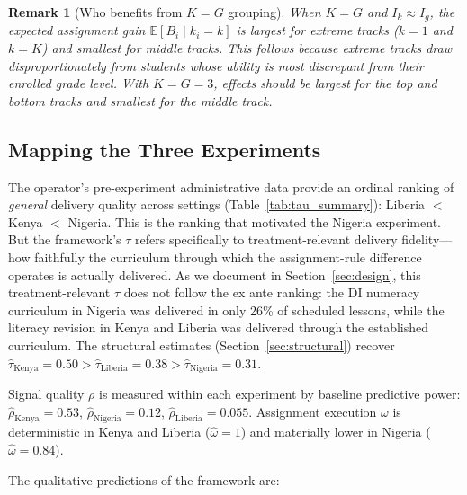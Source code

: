 \documentclass[11pt]{article}
\newtheorem{remark}{Remark}
\newcommand{\E}{\mathbb{E}}
\begin{document}
\begin{remark}[Who benefits from $K = G$ grouping]
\label{rem:tail_effects}
When $K = G$ and $I_k \approx I_g$, the expected assignment gain $\E[B_i \mid k_i = k]$ is largest for extreme tracks ($k = 1$ and $k = K$) and smallest for middle tracks. This follows because extreme tracks draw disproportionately from students whose ability is most discrepant from their enrolled grade level. With $K = G = 3$, effects should be largest for the top and bottom tracks and smallest for the middle track.
\end{remark}

\subsection{Mapping the Three Experiments}

The operator's pre-experiment administrative data provide an ordinal ranking of \emph{general} delivery quality across settings (Table~\ref{tab:tau_summary}): Liberia $<$ Kenya $<$ Nigeria. This is the ranking that motivated the Nigeria experiment. But the framework's $\tau$ refers specifically to treatment-relevant delivery fidelity---how faithfully the curriculum through which the assignment-rule difference operates is actually delivered. As we document in Section~\ref{sec:design}, this treatment-relevant $\tau$ does not follow the ex ante ranking: the DI numeracy curriculum in Nigeria was delivered in only 26\% of scheduled lessons, while the literacy revision in Kenya and Liberia was delivered through the established curriculum. The structural estimates (Section~\ref{sec:structural}) recover $\hat{\tau}_{\text{Kenya}} = 0.50 > \hat{\tau}_{\text{Liberia}} = 0.38 > \hat{\tau}_{\text{Nigeria}} = 0.31$.

Signal quality $\rho$ is measured within each experiment by baseline predictive power: $\hat{\rho}_{\text{Kenya}} = 0.53$, $\hat{\rho}_{\text{Nigeria}} = 0.12$, $\hat{\rho}_{\text{Liberia}} = 0.055$. Assignment execution $\omega$ is deterministic in Kenya and Liberia ($\hat{\omega} = 1$) and materially lower in Nigeria ($\hat{\omega} = 0.84$).

The qualitative predictions of the framework are:
\end{document}
